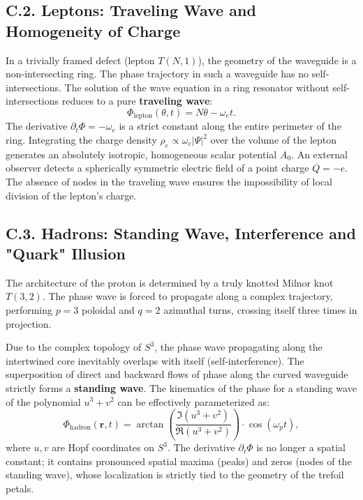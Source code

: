 \documentclass[11pt,a4paper]{article}
\begin{document}
\subsection*{C.2. Leptons: Traveling Wave and Homogeneity of Charge}
In a trivially framed defect (lepton $T(N,1)$), the geometry of the waveguide is a non-intersecting ring. The phase trajectory in such a waveguide has no self-intersections.
The solution of the wave equation in a ring resonator without self-intersections reduces to a pure \textbf{traveling wave}:
\begin{equation}
	\Phi_{\text{lepton}}(\theta, t) = N\theta - \omega_e t.
\end{equation}
The derivative $\partial_t \Phi = -\omega_e$ is a strict constant along the entire perimeter of the ring. 
Integrating the charge density $\rho_e \propto \omega_e |\Psi|^2$ over the volume of the lepton generates an absolutely isotropic, homogeneous scalar potential $A_0$. An external observer detects a spherically symmetric electric field of a point charge $Q = -e$. The absence of nodes in the traveling wave ensures the impossibility of local division of the lepton's charge.

\subsection*{C.3. Hadrons: Standing Wave, Interference and "Quark" Illusion}
The architecture of the proton is determined by a truly knotted Milnor knot $T(3,2)$. The phase wave is forced to propagate along a complex trajectory, performing $p=3$ poloidal and $q=2$ azimuthal turns, crossing itself three times in projection.

Due to the complex topology of $S^3$, the phase wave propagating along the intertwined core inevitably overlaps with itself (self-interference). The superposition of direct and backward flows of phase along the curved waveguide strictly forms a \textbf{standing wave}. The kinematics of the phase for a standing wave of the polynomial $u^3 + v^2$ can be effectively parameterized as:
\begin{equation}
	\Phi_{\text{hadron}}(\mathbf{r}, t) = \arctan\left(\frac{\Im(u^3 + v^2)}{\Re(u^3 + v^2)}\right) \cdot \cos(\omega_p t),
\end{equation}
where $u, v$ are Hopf coordinates on $S^3$. The derivative $\partial_t \Phi$ is no longer a spatial constant; it contains pronounced spatial maxima (peaks) and zeros (nodes of the standing wave), whose localization is strictly tied to the geometry of the trefoil petals.
\end{document}
